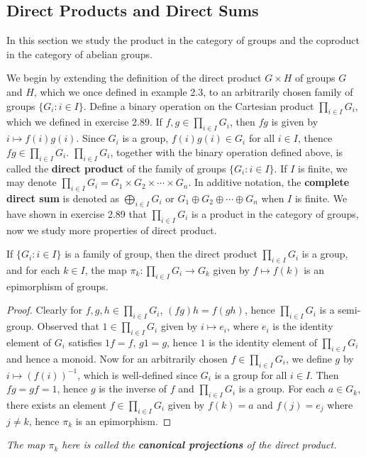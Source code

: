 \subsection{Direct Products and Direct Sums}
In this section we study the product in the category of groups and the coproduct in the category of abelian groups.\par
We begin by extending the definition of the direct product $G\times H$ of groups $G$ and $H$, which we once defined in example 2.3, to an arbitrarily chosen family of groups $\{G_i:i\in I\}$. Define a binary operation on the Cartesian product $\prod_{i\in I}G_i$, which we defined in exercise 2.89. If $f,g\in\prod_{i\in I}G_i$, then $fg$ is given by $i\mapsto f(i)g(i)$. Since $G_i$ is a group, $f(i)g(i)\in G_i$ for all $i\in I$, thence $fg\in\prod_{i\in I}G_i$. $\prod_{i\in I}G_i$, together with the binary operation defined above, is called the \textbf{direct product} of the family of groups $\{G_i:i\in I\}$. If $I$ is finite, we may denote $\prod_{i\in I}G_i=G_1\times G_2\times\cdots\times G_n$. In additive notation, the \textbf{complete direct sum} is denoted as $\bigoplus_{i\in I}G_i$ or $G_1\oplus G_2\oplus\cdots\oplus G_n$ when $I$ is finite. We have shown in exercise 2.89 that $\prod_{i\in I}G_i$ is a product in the category of groups, now we study more properties of direct product.
\begin{proposition}
If $\{G_i:i\in I\}$ is a family of group, then the direct product $\prod_{i\in I}G_i$ is a group, and for each $k\in I$, the map $\pi_k:\prod_{i\in I}G_i\to G_k$ given by $f\mapsto f(k)$ is an epimorphism of groups.
\end{proposition}
\begin{proof}
Clearly for $f,g,h\in\prod_{i\in I}G_i$, $(fg)h=f(gh)$, hence $\prod_{i\in I}G_i$ is a semi-group. Observed that $1\in\prod_{i\in I}G_i$ given by $i\mapsto e_i$, where $e_i$ is the identity element of $G_i$ satisfies $1f=f$, $g1=g$, hence $1$ is the identity element of $\prod_{i\in I}G_i$ and hence a monoid. Now for an arbitrarily chosen $f\in\prod_{i\in I}G_i$, we define $g$ by $i\mapsto(f(i))^{-1}$, which is well-defined since $G_i$ is a group for all $i\in I$. Then $fg=gf=1$, hence $g$ is the inverse of $f$ and $\prod_{i\in I}G_i$ is a group. For each $a\in G_k$, there exists an element $f\in\prod_{i\in I}G_i$ given by $f(k)=a$ and $f(j)=e_j$ where $j\ne k$, hence $\pi_k$ is an epimorphism.
\end{proof}
\begin{note}\em
The map $\pi_k$ here is called the \textbf{canonical projections} of the direct product.
\end{note}

